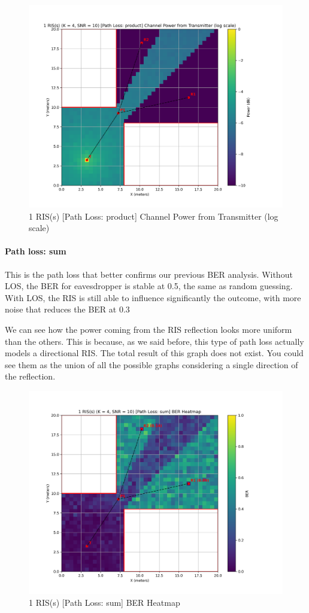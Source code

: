 \begin{figure}[H]
  \centering
  \includegraphics[width=0.7\linewidth]{imgs/heatmap-simulations/1 RIS(s) (K = 4, SNR = 10) [Path Loss_ product] Channel Power from Transmitter (log scale).png}
  \caption{1 RIS(s) [Path Loss: product] Channel Power from Transmitter (log scale)}
\end{figure}

\paragraph*{Path loss: sum}
This is the path loss that better confirms our previous BER analysis. Without LOS, the BER for eavesdropper is stable at 0.5, the same as random guessing. With LOS, the RIS is still able to influence significantly the outcome, with more noise that reduces the BER at 0.3

We can see how the power coming from the RIS reflection looks more uniform than the others. This is because, as we said before, this type of path loss actually models a directional RIS. The total result of this graph does not exist. You could see them as the union of all the possible graphs considering a single direction of the reflection.

\begin{figure}[H]
  \centering
  \includegraphics[width=0.7\linewidth]{imgs/heatmap-simulations/1 RIS(s) (K = 4, SNR = 10) [Path Loss_ sum] BER Heatmap.png}
  \caption{1 RIS(s) [Path Loss: sum] BER Heatmap}
\end{figure}


